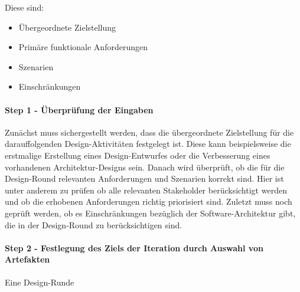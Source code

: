 Diese sind:
\begin{itemize}
\item Übergeordnete Zielstellung
\item Primäre funktionale Anforderungen
\item Szenarien
\item Einschränkungen
\end{itemize}

\paragraph{Step 1 - Überprüfung der Eingaben}
Zunächst muss sichergestellt werden, dass die übergeordnete Zielstellung für die darauffolgenden Design-Aktivitäten festgelegt ist. Diese kann beispielsweise die erstmalige Erstellung eines Design-Entwurfes oder die Verbesserung eines vorhandenen Architektur-Designs sein. Danach wird überprüft, ob die für die Design-Round relevanten Anforderungen und Szenarien korrekt sind. Hier ist unter anderem zu prüfen ob alle relevanten Stakeholder berücksichtigt werden und ob die erhobenen Anforderungen richtig priorisiert sind. Zuletzt muss noch geprüft werden, ob es Einschränkungen bezüglich der Software-Architektur gibt, die in der Design-Round zu berücksichtigen sind.\\

\paragraph{Step 2 - Festlegung des Ziels der Iteration durch Auswahl von Artefakten}
Eine Design-Runde 